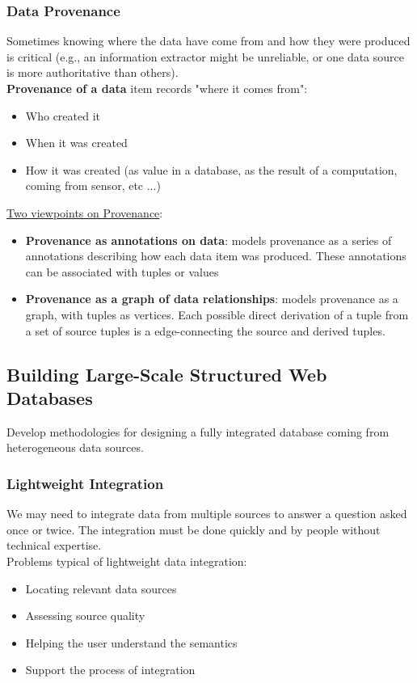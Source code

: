 \documentclass[10pt,a4paper]{article}
\begin{document}
\subsubsection{Data Provenance}
Sometimes knowing where the data have come from and how they were produced is critical (e.g., an information extractor might be unreliable, or one data source is more authoritative than others). \\
\textbf{Provenance of a data} item records "where it comes from":
\begin{itemize}
	\item Who created it
	\item When it was created
	\item How it was created (as value in a database, as the result of a computation, coming from sensor, etc ...)
\end{itemize}
\uline{Two viewpoints on Provenance}:
\begin{itemize}
	\item \textbf{Provenance as annotations on data}: models provenance as a series of annotations describing how each data item was produced. These annotations can be associated with tuples or values
	\item \textbf{Provenance as a graph of data relationships}: models provenance as a graph, with tuples as vertices. Each possible direct derivation of a tuple from a set of source tuples is a edge-connecting the source and derived tuples.
\end{itemize}
\subsection{Building Large-Scale Structured Web Databases}
Develop methodologies for designing a fully integrated database coming from heterogeneous data sources.
\subsubsection{Lightweight Integration}
We may need to integrate data from multiple sources to answer a question asked once or twice. The integration must be done quickly and by people without technical expertise.
\\ Problems typical of lightweight data integration:
\begin{itemize}
	\item Locating relevant data sources
	\item Assessing source quality
	\item Helping the user understand the semantics
	\item Support the process of integration
\end{itemize}
\end{document}
